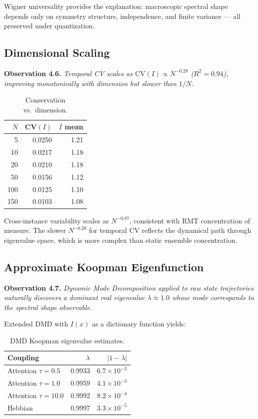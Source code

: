 \documentclass[11pt]{article}
\begin{document}
Wigner universality provides the explanation: macroscopic spectral shape depends only on symmetry structure, independence, and finite variance --- all preserved under quantization.

\subsection{Dimensional Scaling}

\textbf{Observation 4.6.} \textit{Temporal CV scales as $\mathrm{CV}(I) \propto N^{-0.28}$ ($R^2 = 0.94$), improving monotonically with dimension but slower than $1/N$.}

\begin{table}[h]
  \centering
  \caption{Conservation vs.\ dimension.}
  \label{tab:dimension}
  \begin{tabular}{rrr}
    \toprule
    $N$ & CV$(I)$ & $I$ mean \\
    \midrule
    5   & 0.0250 & 1.21 \\
    10  & 0.0217 & 1.18 \\
    20  & 0.0210 & 1.18 \\
    50  & 0.0156 & 1.12 \\
    100 & 0.0125 & 1.10 \\
    150 & 0.0103 & 1.08 \\
    \bottomrule
  \end{tabular}
\end{table}

Cross-instance variability scales as $N^{-0.87}$, consistent with RMT concentration of measure. The slower $N^{-0.28}$ for temporal CV reflects the dynamical path through eigenvalue space, which is more complex than static ensemble concentration.

\subsection{Approximate Koopman Eigenfunction}

\textbf{Observation 4.7.} \textit{Dynamic Mode Decomposition applied to raw state trajectories naturally discovers a dominant real eigenvalue $\lambda \approx 1.0$ whose mode corresponds to the spectral shape observable.}

Extended DMD with $I(x)$ as a dictionary function yields:

\begin{table}[h]
  \centering
  \caption{DMD Koopman eigenvalue estimates.}
  \label{tab:dmd}
  \begin{tabular}{lrr}
    \toprule
    Coupling & $\lambda$ & $|1 - \lambda|$ \\
    \midrule
    Attention $\tau=0.5$  & 0.9933 & $6.7 \times 10^{-3}$ \\
    Attention $\tau=1.0$  & 0.9959 & $4.1 \times 10^{-3}$ \\
    Attention $\tau=10.0$ & 0.9992 & $8.2 \times 10^{-4}$ \\
    Hebbian               & 0.9997 & $3.3 \times 10^{-5}$ \\
    \bottomrule
  \end{tabular}
\end{table}
\end{document}
